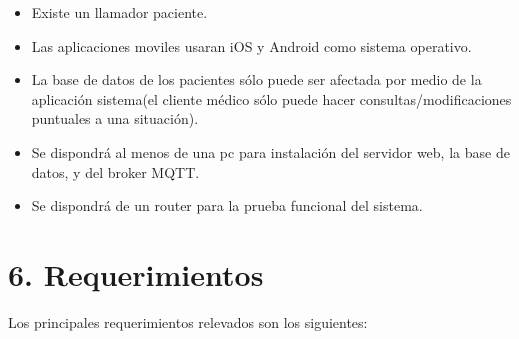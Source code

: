 \documentclass[
11pt, %
]{charter}
\begin{document}
\begin{itemize}
	\item Existe un llamador paciente. 
	\item Las aplicaciones moviles usaran iOS y Android como sistema operativo.
	\item La base de datos de los pacientes sólo puede ser afectada por medio de la aplicación sistema(el cliente médico sólo puede hacer consultas/modificaciones puntuales a una situación).	
	\item Se dispondrá al menos de una pc para instalación del servidor web, la base de datos, y del broker MQTT.
	\item Se dispondrá de un router para la prueba funcional del sistema. 

\end{itemize}






\section{6. Requerimientos}
\label{sec:requerimientos}
Los principales requerimientos relevados son los siguientes:
\end{document}
